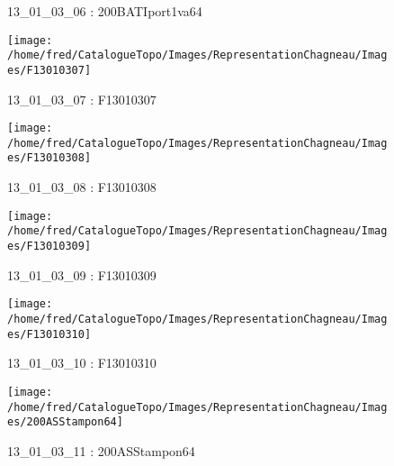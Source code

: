 \documentclass[12pt,titlepage,oneside]{book}
\begin{document}
\begin{figure}[h!]
\begin{minipage}[t]{3cm}
\begin{center}
      \caption[200BATIport1va64]{\label{} 13\_01\_03\_06 : 200BATIport1va64}
    \end{center}
  \end{minipage}
  \begin{minipage}[t]{3cm}
    \begin{center}
      \texttt{[image: /home/fred/CatalogueTopo/Images/RepresentationChagneau/Images/F13010307]}
      \caption[F13010307]{\label{} 13\_01\_03\_07 : F13010307}
    \end{center}
  \end{minipage}
  \begin{minipage}[t]{3cm}
    \begin{center}
      \texttt{[image: /home/fred/CatalogueTopo/Images/RepresentationChagneau/Images/F13010308]}
      \caption[F13010308]{\label{} 13\_01\_03\_08 : F13010308}
    \end{center}
  \end{minipage}
  \begin{minipage}[t]{3cm}
    \begin{center}
      \texttt{[image: /home/fred/CatalogueTopo/Images/RepresentationChagneau/Images/F13010309]}
      \caption[F13010309]{\label{} 13\_01\_03\_09 : F13010309}
    \end{center}
  \end{minipage}
  \begin{minipage}[t]{3cm}
    \begin{center}
      \texttt{[image: /home/fred/CatalogueTopo/Images/RepresentationChagneau/Images/F13010310]}
      \caption[F13010310]{\label{} 13\_01\_03\_10 : F13010310}
    \end{center}
  \end{minipage}
  \begin{minipage}[t]{3cm}
    \begin{center}
      \texttt{[image: /home/fred/CatalogueTopo/Images/RepresentationChagneau/Images/200ASStampon64]}
      \caption[200ASStampon64]{\label{} 13\_01\_03\_11 : 200ASStampon64}
    \end{center}
  \end{minipage}
  \begin{minipage}[t]{3cm}
    \begin{center}

\end{center}
\end{minipage}
\end{figure}
\end{document}
